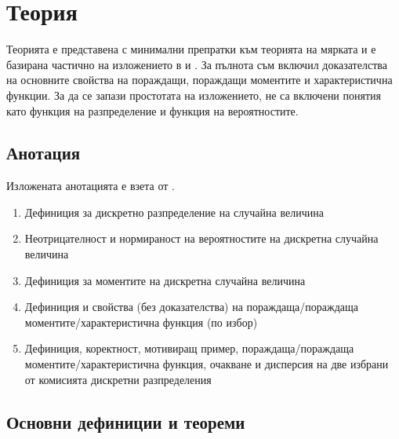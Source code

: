 \documentclass{../../common/topic}
\begin{document}
\maketitle

\section{Теория}

Теорията е представена с минимални препратки към теорията на мярката и е базирана частично на изложението в \cite{Боровков1999Вероятности} и \cite{ДимитровЯнев2007}. За пълнота съм включил доказателства на основните свойства на пораждащи, пораждащи моментите и характеристична функции. За да се запази простотата на изложението, не са включени понятия като функция на разпределение и функция на вероятностите.

\subsection{Анотация}

Изложената анотацията е взета от \cite{Syllabus}.

\begin{enumerate}
  \item Дефиниция за дискретно разпределение на случайна величина
  \item Неотрицателност и нормираност на вероятностите на дискретна случайна величина
  \item Дефиниция за моментите на дискретна случайна величина
  \item Дефиниция и свойства (без доказателства) на пораждаща/пораждаща моментите/характеристична функция (по избор)
  \item Дефиниция, коректност, мотивиращ пример, пораждаща/пораждаща моментите/характеристична функция, очакване и дисперсия на две избрани от комисията дискретни разпределения
\end{enumerate}

\subsection{Основни дефиниции и теореми}
\end{document}
